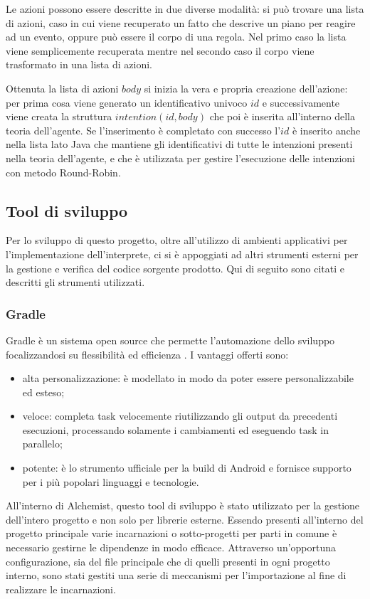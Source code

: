 Le azioni possono essere descritte in due diverse modalità: si può trovare una lista di azioni, caso in cui viene recuperato un fatto che descrive un piano per reagire ad un evento, oppure può essere il corpo di una regola. Nel primo caso la lista viene semplicemente recuperata mentre nel secondo caso il corpo viene trasformato in una lista di azioni.

Ottenuta la lista di azioni $body$ si inizia la vera e propria creazione dell'azione: per prima cosa viene generato un identificativo univoco $id$ e successivamente viene creata la struttura $intention(id,body)$ che poi è inserita all'interno della teoria dell'agente. Se l'inserimento è completato con successo l'$id$ è inserito anche nella lista lato Java che mantiene gli identificativi di tutte le intenzioni presenti nella teoria dell'agente, e che è utilizzata per gestire l'esecuzione delle intenzioni con metodo Round-Robin.


\subsection{Tool di sviluppo}
Per lo sviluppo di questo progetto, oltre all'utilizzo di ambienti applicativi per l'implementazione dell'interprete, ci si è appoggiati ad altri strumenti esterni per la gestione e verifica del codice sorgente prodotto. Qui di seguito sono citati e descritti gli strumenti utilizzati.

\subsubsection{Gradle}
Gradle è un sistema open source che permette l'automazione dello sviluppo focalizzandosi su flessibilità ed efficienza \cite{Gradle}. I vantaggi offerti sono:
\begin{itemize}
\item alta personalizzazione: è modellato in modo da poter essere personalizzabile ed esteso;
\item veloce: completa task velocemente riutilizzando gli output da precedenti esecuzioni, processando solamente i cambiamenti ed eseguendo task in parallelo;
\item potente: è lo strumento ufficiale per la build di Android e fornisce supporto per i più popolari linguaggi e tecnologie.
\end{itemize}
All'interno di Alchemist, questo tool di sviluppo è stato utilizzato per la gestione dell'intero progetto e non solo per librerie esterne. Essendo presenti all'interno del progetto principale varie incarnazioni o sotto-progetti per parti in comune è necessario gestirne le dipendenze in modo efficace. Attraverso un'opportuna configurazione, sia del file principale che di quelli presenti in ogni progetto interno, sono stati gestiti una serie di meccanismi per l'importazione al fine di realizzare le incarnazioni.

